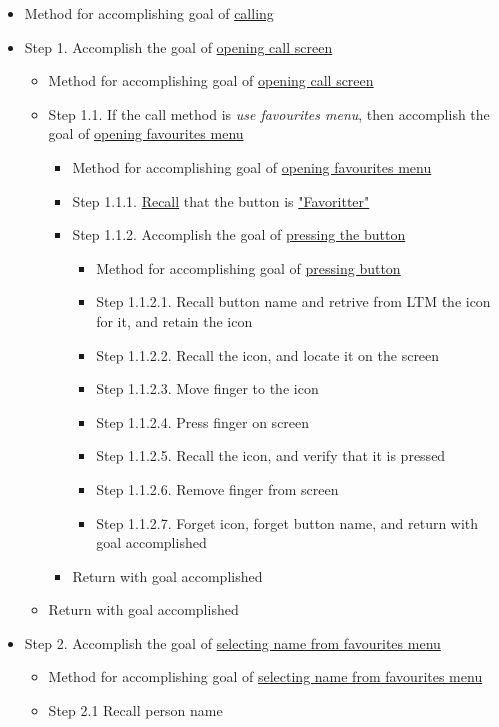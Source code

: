 \documentclass{article}
\begin{document}
\begin{itemize}
	\item Method for accomplishing goal of \uline{calling}
	\item Step 1. Accomplish the goal of \uline{opening call screen}
		\begin{itemize}
			\item Method for accomplishing goal of \uline{opening call screen}
			\item Step 1.1. If the call method is \textit{use favourites menu}, then accomplish the goal of \uline{opening favourites menu}
			\begin{itemize}
				\item Method for accomplishing goal of \uline{opening favourites menu}
				\item Step 1.1.1. \uline{Recall} that the button is \uline{"Favoritter"}
				\item Step 1.1.2. Accomplish the goal of \uline{pressing the button}
				\begin{itemize}
					\item Method for accomplishing goal of \uline{pressing button}
					\item Step 1.1.2.1. Recall button name and retrive from LTM the icon for it, and retain the icon
					\item Step 1.1.2.2. Recall the icon, and locate it on the screen
					\item Step 1.1.2.3. Move finger to the icon
					\item Step 1.1.2.4. Press finger on screen
					\item Step 1.1.2.5. Recall the icon, and verify that it is pressed
					\item Step 1.1.2.6. Remove finger from screen
					\item Step 1.1.2.7. Forget icon, forget button name, and return with goal accomplished
				\end{itemize}
    				\item Return with goal accomplished
			\end{itemize}
    			\item Return with goal accomplished
		\end{itemize}
	\item Step 2. Accomplish the goal of \uline{selecting name from favourites menu}
		\begin{itemize}
    			\item Method for accomplishing goal of \uline{selecting name from favourites menu}
    			\item Step 2.1 Recall person name

\end{itemize}
\end{itemize}
\end{document}
